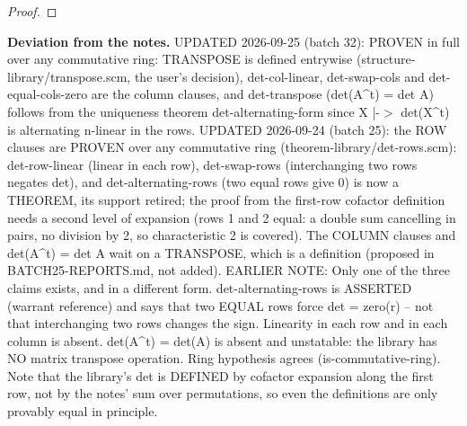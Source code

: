 \begin{proof}
%
%
%
%
%
%
%
\end{proof}
%
\noindent\textbf{Deviation from the notes.} UPDATED 2026-09-25 (batch 32): PROVEN in full over any commutative ring: TRANSPOSE is defined entrywise (structure-library/transpose.scm, the user's decision), det-col-linear, det-swap-cols and det-equal-cols-zero are the column clauses, and det-transpose (det(A\textasciicircum{}t) = det A) follows from the uniqueness theorem det-alternating-form since X |-$>$ det(X\textasciicircum{}t) is alternating n-linear in the rows. UPDATED 2026-09-24 (batch 25): the ROW clauses are PROVEN over any commutative ring (theorem-library/det-rows.scm): det-row-linear (linear in each row), det-swap-rows (interchanging two rows negates det), and det-alternating-rows (two equal rows give 0) is now a THEOREM, its support retired; the proof from the first-row cofactor definition needs a second level of expansion (rows 1 and 2 equal: a double sum cancelling in pairs, no division by 2, so characteristic 2 is covered). The COLUMN clauses and det(A\textasciicircum{}t) = det A wait on a TRANSPOSE, which is a definition (proposed in BATCH25-REPORTS.md, not added). EARLIER NOTE: Only one of the three claims exists, and in a different form.  det-alternating-rows is ASSERTED (warrant reference) and says that two EQUAL rows force det = zero(r) -- not that interchanging two rows changes the sign.  Linearity in each row and in each column is absent.  det(A\textasciicircum{}t) = det(A) is absent and unstatable: the library has NO matrix transpose operation.  Ring hypothesis agrees (is-commutative-ring).  Note that the library's det is DEFINED by cofactor expansion along the first row, not by the notes' sum over permutations, so even the definitions are only provably equal in principle.
